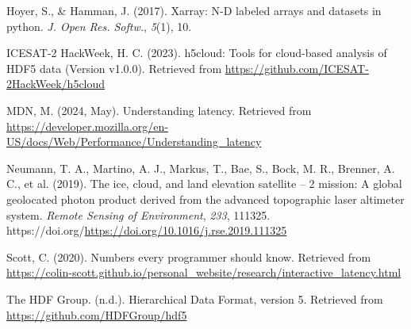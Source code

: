 \documentclass[
]{agujournal2019}
\newlength{\cslhangindent}
\newenvironment{CSLReferences}[2] %
 {\begin{list}{}{%
  \setlength{\itemindent}{0pt}
  \setlength{\leftmargin}{0pt}
  \setlength{\parsep}{0pt}
  \ifodd #1
   \setlength{\leftmargin}{\cslhangindent}
   \setlength{\itemindent}{-1\cslhangindent}
  \fi
  \setlength{\itemsep}{#2\baselineskip}}}
 {\end{list}}
\begin{document}
\label{refs}
\begin{CSLReferences}{1}{0}
\vspace{1em}

Hoyer, S., \& Hamman, J. (2017). Xarray: {N-D} labeled arrays and
datasets in python. \emph{J. Open Res. Softw.}, \emph{5}(1), 10.

ICESAT-2 HackWeek, H. C. (2023). h5cloud: Tools for cloud-based analysis
of HDF5 data (Version v1.0.0). Retrieved from
\url{https://github.com/ICESAT-2HackWeek/h5cloud}

MDN, M. (2024, May). Understanding latency. Retrieved from
\url{https://developer.mozilla.org/en-US/docs/Web/Performance/Understanding_latency}

Neumann, T. A., Martino, A. J., Markus, T., Bae, S., Bock, M. R.,
Brenner, A. C., et al. (2019). The ice, cloud, and land elevation
satellite -- 2 mission: A global geolocated photon product derived from
the advanced topographic laser altimeter system. \emph{Remote Sensing of
Environment}, \emph{233}, 111325.
https://doi.org/\url{https://doi.org/10.1016/j.rse.2019.111325}

Scott, C. (2020). Numbers every programmer should know. Retrieved from
\url{https://colin-scott.github.io/personal_website/research/interactive_latency.html}

The HDF Group. (n.d.). {Hierarchical Data Format, version 5}. Retrieved
from \url{https://github.com/HDFGroup/hdf5}

\end{CSLReferences}
\end{document}
